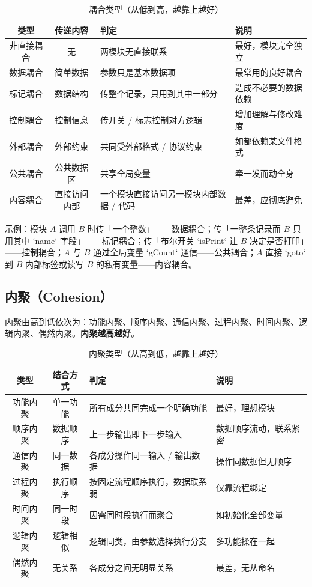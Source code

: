 \begin{table}[H]
\centering
\caption{耦合类型（从低到高，越靠上越好）}
\begin{tabulary}{\textwidth}{CCLL}
\toprule
类型 & 传递内容 & 判定 & 说明 \\
\midrule
非直接耦合 & 无 & 两模块无直接联系 & 最好，模块完全独立 \\
数据耦合 & 简单数据 & 参数只是基本数据项 & 最常用的良好耦合 \\
标记耦合 & 数据结构 & 传整个记录，只用到其中一部分 & 造成不必要的数据依赖 \\
控制耦合 & 控制信息 & 传开关 / 标志控制对方逻辑 & 增加理解与修改难度 \\
外部耦合 & 外部约束 & 共同受外部格式 / 协议约束 & 如都依赖某文件格式 \\
公共耦合 & 公共数据区 & 共享全局变量 & 牵一发而动全身 \\
内容耦合 & 直接访问内部 & 一个模块直接访问另一模块内部数据 / 代码 & 最差，应彻底避免 \\
\bottomrule
\end{tabulary}
\end{table}

示例：模块 $A$ 调用 $B$ 时传「一个整数」——数据耦合；传「一整条记录而 $B$ 只用其中 `name` 字段」——标记耦合；传「布尔开关 `isPrint` 让 $B$ 决定是否打印」——控制耦合；$A$ 与 $B$ 通过全局变量 `gCount` 通信——公共耦合；$A$ 直接 `goto` 到 $B$ 内部标签或读写 $B$ 的私有变量——内容耦合。

\subsection{内聚（Cohesion）}

内聚由高到低依次为：功能内聚、顺序内聚、通信内聚、过程内聚、时间内聚、逻辑内聚、偶然内聚。\textbf{内聚越高越好}。

\begin{table}[H]
\centering
\caption{内聚类型（从高到低，越靠上越好）}
\begin{tabulary}{\textwidth}{CCLL}
\toprule
类型 & 结合方式 & 判定 & 说明 \\
\midrule
功能内聚 & 单一功能 & 所有成分共同完成一个明确功能 & 最好，理想模块 \\
顺序内聚 & 数据顺序 & 上一步输出即下一步输入 & 数据顺序流动，联系紧密 \\
通信内聚 & 同一数据 & 各成分操作同一输入 / 输出数据 & 操作同数据但无顺序 \\
过程内聚 & 执行顺序 & 按固定流程顺序执行，数据联系弱 & 仅靠流程绑定 \\
时间内聚 & 同一时段 & 因需同时段执行而聚合 & 如初始化全部变量 \\
逻辑内聚 & 逻辑相似 & 逻辑同类，由参数选择执行分支 & 多功能揉在一起 \\
偶然内聚 & 无关系 & 各成分之间无明显关系 & 最差，无从命名 \\
\bottomrule
\end{tabulary}
\end{table}

